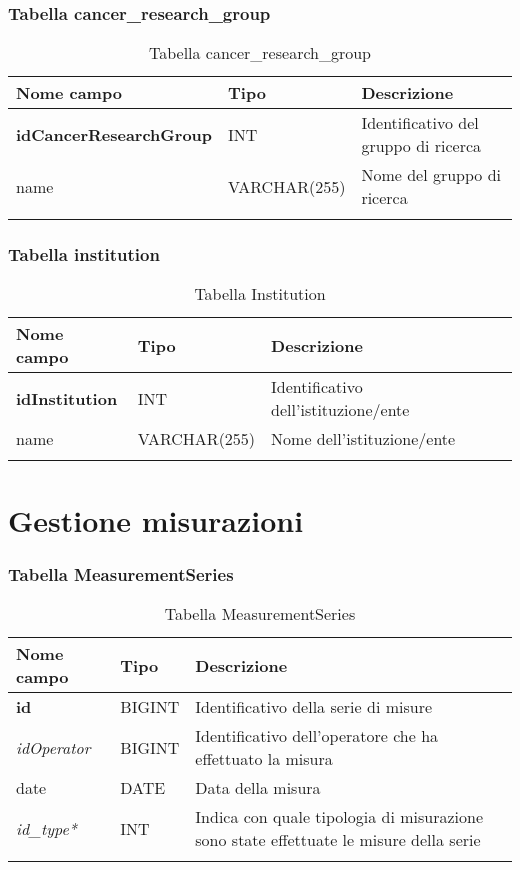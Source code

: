 \subsubsection{Tabella cancer\_research\_group}

\begin{longtable}{|l|l|p{5.5cm}|}
\hline
\textbf{Nome campo} &	\textbf{Tipo} &	\textbf{Descrizione}\\ \hline
\textbf{idCancerResearchGroup} &	INT &	Identificativo del gruppo di ricerca\\ \hline
name &	VARCHAR(255) &	Nome del gruppo di ricerca\\ \hline
\caption{Tabella cancer\_research\_group}
\end{longtable}

\subsubsection{Tabella institution}

\begin{longtable}{|l|l|p{5.5cm}|}
\hline
\textbf{Nome campo} &	\textbf{Tipo} &	\textbf{Descrizione}\\ \hline
\textbf{idInstitution} &	INT &	Identificativo dell'istituzione/ente\\ \hline
name &	VARCHAR(255) &	Nome dell'istituzione/ente\\ \hline
\caption{Tabella Institution}
\end{longtable}

\section{Gestione misurazioni}

\subsubsection{Tabella MeasurementSeries}

\begin{longtable}{|l|l|p{7.5cm}|}
\hline
\textbf{Nome campo} &	\textbf{Tipo} &	\textbf{Descrizione}\\ \hline
\textbf{id} &	BIGINT &	Identificativo della serie di misure\\ \hline
\textit{idOperator} &	BIGINT &	Identificativo dell'operatore che ha effettuato la misura\\ \hline
date &	DATE &	Data della misura\\ \hline
\textit{id\_type*} & INT & Indica con quale tipologia di misurazione sono state effettuate le misure della serie\\ \hline
\caption{Tabella MeasurementSeries}
\end{longtable}

